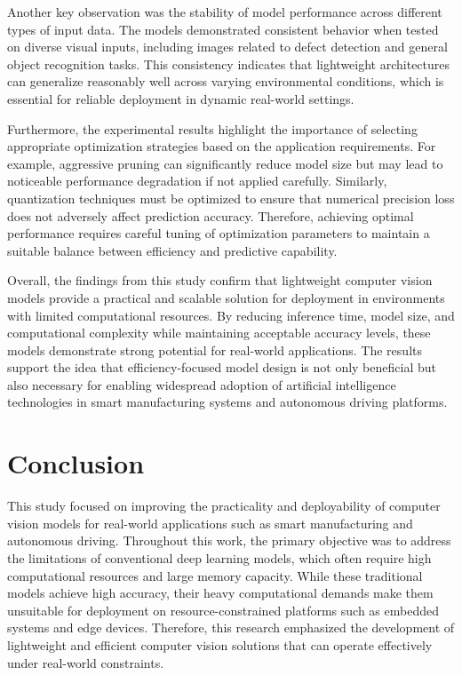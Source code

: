 \documentclass[conference]{IEEEtran}
\begin{document}
Another key observation was the stability of model performance across different types of input data. The models demonstrated consistent behavior when tested on diverse visual inputs, including images related to defect detection and general object recognition tasks. This consistency indicates that lightweight architectures can generalize reasonably well across varying environmental conditions, which is essential for reliable deployment in dynamic real-world settings.

Furthermore, the experimental results highlight the importance of selecting appropriate optimization strategies based on the application requirements. For example, aggressive pruning can significantly reduce model size but may lead to noticeable performance degradation if not applied carefully. Similarly, quantization techniques must be optimized to ensure that numerical precision loss does not adversely affect prediction accuracy. Therefore, achieving optimal performance requires careful tuning of optimization parameters to maintain a suitable balance between efficiency and predictive capability.

Overall, the findings from this study confirm that lightweight computer vision models provide a practical and scalable solution for deployment in environments with limited computational resources. By reducing inference time, model size, and computational complexity while maintaining acceptable accuracy levels, these models demonstrate strong potential for real-world applications. The results support the idea that efficiency-focused model design is not only beneficial but also necessary for enabling widespread adoption of artificial intelligence technologies in smart manufacturing systems and autonomous driving platforms.

\section{Conclusion}

This study focused on improving the practicality and deployability of computer vision models for real-world applications such as smart manufacturing and autonomous driving. Throughout this work, the primary objective was to address the limitations of conventional deep learning models, which often require high computational resources and large memory capacity. While these traditional models achieve high accuracy, their heavy computational demands make them unsuitable for deployment on resource-constrained platforms such as embedded systems and edge devices. Therefore, this research emphasized the development of lightweight and efficient computer vision solutions that can operate effectively under real-world constraints.
\end{document}

